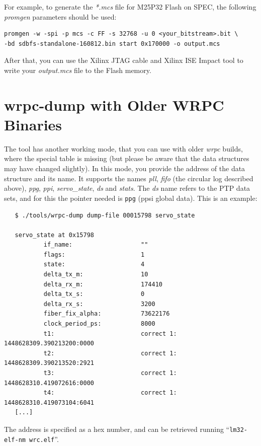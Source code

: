 \documentclass[a4paper, 12pt]{article}
\begin{document}
For example, to generate the \textit{*.mcs} file for M25P32 Flash on SPEC, the
following \textit{promgen} parameters should be used:
\begin{lstlisting}
promgen -w -spi -p mcs -c FF -s 32768 -u 0 <your_bitstream>.bit \
-bd sdbfs-standalone-160812.bin start 0x170000 -o output.mcs
\end{lstlisting}

After that, you can use the Xilinx JTAG cable and Xilinx ISE Impact tool to
write your \textit{output.mcs} file to the Flash memory.
\newpage
\section{wrpc-dump with Older WRPC Binaries}
\label{wrpc-dump with Older WRPC Binaries}

The tool has another working mode, that you can use with older
\textit{wrpc} builds, where the special table is missing (but please be
aware that the data structures may have changed slightly).  In this
mode, you provide the address of the data structure and its name. It
supports the names \textit{pll}, \textit{fifo} (the circular log described
above), \textit{ppg}, \textit{ppi}, \textit{servo\_state}, \textit{ds} and
\textit{stats}. The \textit{ds} name
refers to the PTP data sets, and for this the pointer needed is
\texttt{ppg} (ppsi global data).
This is an example:

\begin{lstlisting}
   $ ./tools/wrpc-dump dump-file 00015798 servo_state

   servo_state at 0x15798
           if_name:                   ""
           flags:                     1
           state:                     4
           delta_tx_m:                10
           delta_rx_m:                174410
           delta_tx_s:                0
           delta_rx_s:                3200
           fiber_fix_alpha:           73622176
           clock_period_ps:           8000
           t1:                        correct 1: 1448628309.390213200:0000
           t2:                        correct 1: 1448628309.390213520:2921
           t3:                        correct 1: 1448628310.419072616:0000
           t4:                        correct 1: 1448628310.419073104:6041
   [...]
\end{lstlisting}

The address is specified as a hex number, and can be retrieved running
``\texttt{lm32-elf-nm  wrc.elf}''.
\end{document}
